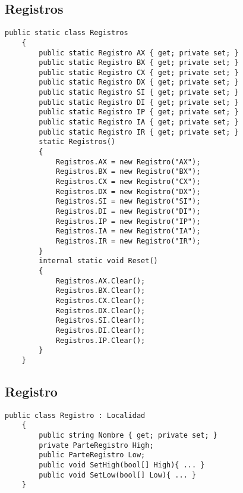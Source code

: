 \documentclass[conference]{IEEEtran}
\begin{document}
\newpage
\begin{figure*}[t]
    \subsection{Registros}
    \begin{lstlisting}[language={[Sharp]C}, title={Registros}]
    public static class Registros
    {
        public static Registro AX { get; private set; }
        public static Registro BX { get; private set; }
        public static Registro CX { get; private set; }
        public static Registro DX { get; private set; }
        public static Registro SI { get; private set; }
        public static Registro DI { get; private set; }
        public static Registro IP { get; private set; }
        public static Registro IA { get; private set; }
        public static Registro IR { get; private set; }
        static Registros()
        {
            Registros.AX = new Registro("AX");
            Registros.BX = new Registro("BX");
            Registros.CX = new Registro("CX");
            Registros.DX = new Registro("DX");
            Registros.SI = new Registro("SI");
            Registros.DI = new Registro("DI");
            Registros.IP = new Registro("IP");
            Registros.IA = new Registro("IA");
            Registros.IR = new Registro("IR");
        }
        internal static void Reset()
        {
            Registros.AX.Clear();
            Registros.BX.Clear();
            Registros.CX.Clear();
            Registros.DX.Clear();
            Registros.SI.Clear();
            Registros.DI.Clear();
            Registros.IP.Clear();
        }
    }
\end{lstlisting}
\end{figure*}
\newpage

\begin{figure*}[t]
    \subsection{Registro}
\begin{lstlisting}[language={[Sharp]C}, title={Registro}]
    public class Registro : Localidad
    {
        public string Nombre { get; private set; }
        private ParteRegistro High;
        public ParteRegistro Low;
        public void SetHigh(bool[] High){ ... }
        public void SetLow(bool[] Low){ ... }
    }
\end{lstlisting}
\end{figure*}

\newpage
\end{document}
